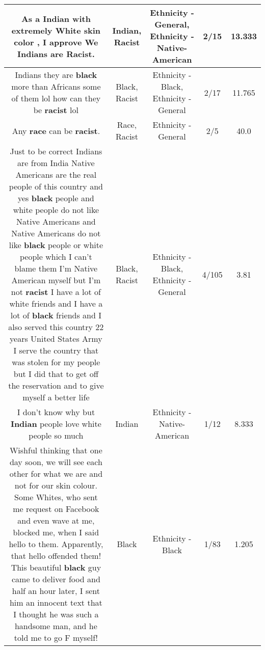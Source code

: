 \documentclass[11pt]{article}
\newlength\mylength
\begin{document}
\begin{center}
\begin{longtable}{|C{.65\mylength}|C{.30\mylength}|C{.12\mylength}|C{.12\mylength}|C{.12\mylength}|}
  \small As a \textbf{Indian} with extremely White skin color , I approve We Indians are \textbf{Racist}.\normalsize   & Indian, Racist & Ethnicity - General, Ethnicity - Native-American & 2/15 & 13.333 \\  \hline
  \small Indians they are \textbf{black} more than Africans some of them lol how can they be \textbf{racist} lol\normalsize   & Black, Racist & Ethnicity - Black, Ethnicity - General & 2/17 & 11.765 \\  \hline
  \small Any \textbf{race} can be \textbf{racist}.\normalsize   & Race, Racist & Ethnicity - General & 2/5 & 40.0 \\  \hline
  \small Just to be correct Indians are from India Native Americans are the real people of this country and yes \textbf{black} people and white people do not like Native Americans and Native Americans do not like \textbf{black} people or white people which I can't blame them I'm Native American myself but I'm not \textbf{racist} I have a lot of white friends and I have a lot of \textbf{black} friends and I also served this country 22 years United States Army I serve the country that was stolen for my people but I did that to get off the reservation and to give myself a better life\normalsize   & Black, Racist & Ethnicity - Black, Ethnicity - General & 4/105 & 3.81 \\  \hline
  \small I don't know why but \textbf{Indian} people love white people so much\normalsize   & Indian & Ethnicity - Native-American & 1/12 & 8.333 \\  \hline
  \small Wishful thinking that one day soon, we will see each other for what we are and not for our skin colour. Some Whites, who sent me request on Facebook and even wave at me, blocked me, when I said hello to them. Apparently, that hello offended them! This beautiful \textbf{black} guy came to deliver food and half an hour later, I sent him an innocent text that I thought he was such a handsome man, and he told me to go F myself!\normalsize   & Black & Ethnicity - Black & 1/83 & 1.205 \\  \hline

\end{longtable}
\end{center}
\end{document}
